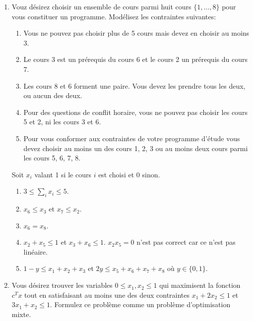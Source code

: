 \begin{enumerate}
  \item Vouz désirez choisir un ensemble de cours parmi huit cours $\{1, \ldots,
    8 \}$ pour vous constituer un programme. Modélisez les contraintes
    suivantes:

    \begin{enumerate}
      \item Vous ne pouvez pas choisir plus de 5 cours mais devez en choisir au
        moins 3.
      \item Le cours 3 est un prérequis du cours 6 et le cours 2 un prérequis
        du cours 7.
      \item Les cours 8 et 6 forment une paire. Vous devez les prendre tous les
        deux, ou aucun des deux.
      \item Pour des questions de conflit horaire, vous ne pouvez pas choisir
        les cours 5 et 2, ni les cours 3 et 6.
      \item Pour vous conformer aux contraintes de votre programme d'étude vous devez choisir au moins un des cours
        1, 2, 3 ou au moins deux cours parmi les cours 5, 6, 7, 8.
    \end{enumerate}


    \begin{solution}
      Soit $x_i$ valant 1 si le cours $i$ est choisi et 0 sinon.
      \begin{enumerate}
        \item $3 \le \sum_{i} x_{i} \le 5$.
        \item $x_{6} \le x_{3}$ et $x_{7} \le x_{2}$.
        \item $x_{6} = x_{8}$.
        \item $x_{2} + x_{5} \le 1$ et $x_{3} + x_{6} \le 1$.
          $x_2x_5 = 0$ n'est pas correct car ce n'est pas linéaire.
        \item $ 1-y \le x_{1} + x_{2} + x_{3}$ et
          $ 2y \le x_{5} + x_{6} + x_{7} + x_{8}$
          où $y \in \lbrace 0,1\rbrace$.
      \end{enumerate}
    \end{solution}

  \item Vous désirez trouver les variables $0 \leq x_1, x_2 \leq 1$ qui maximisent la fonction $c^T x$ tout en satisfaisant au
    moins une  des deux contraintes $x_1 + 2 x_2 \leq 1$  et  $3 x_1 +  x_2 \leq 1$. Formulez ce problème comme un
    problème d'optimisation mixte.


\end{enumerate}
